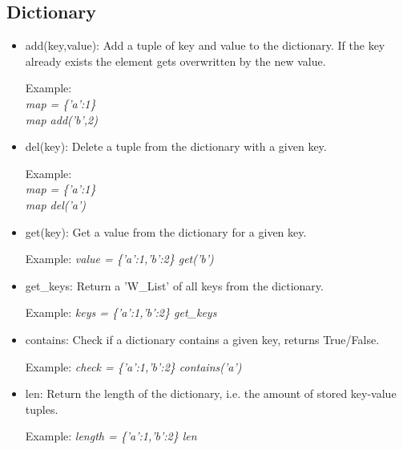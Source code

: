 \documentclass{article}
\begin{document}
\subsection{Dictionary}
\label{builtin_dict}
\begin{itemize}
\item add(key,value): Add a tuple of key and value to the dictionary. If the key already exists the element gets overwritten by the new value.

Example: \\ 
\textit{map = \{'a':1\} \\
map add('b',2)}

\item del(key): Delete a tuple from the dictionary with a given key. 

Example: \\ 
\textit{map = \{'a':1\} \\
map del('a')}

\item get(key): Get a value from the dictionary for a given key.

Example: \textit{value = \{'a':1,'b':2\} get('b')}

\item get\_keys: Return a 'W\_List' of all keys from the dictionary.

Example: \textit{keys = \{'a':1,'b':2\} get\_keys}

\item contains: Check if a dictionary contains a given key, returns True/False.

Example: \textit{check = \{'a':1,'b':2\} contains('a')}

\item len: Return the length of the dictionary, i.e. the amount of stored key-value tuples.

Example: \textit{length = \{'a':1,'b':2\} len}

\end{itemize}
\end{document}
